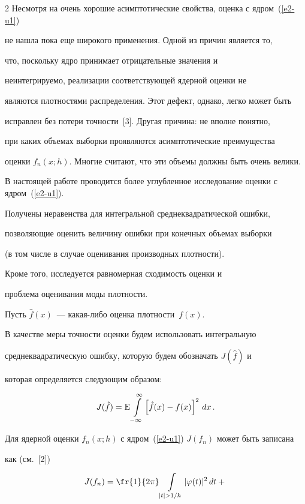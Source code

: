 \begin{multicols}{2}
Несмотря на очень хорошие асимптотические свойства, оценка с ядром~(\ref{e2-u1})

не нашла пока еще широкого применения. Одной из причин является то,

что, поскольку ядро принимает отрицательные значения и

неинтегрируемо, реализации соответствующей ядерной оценки не

являются плотностями распределения. Этот дефект, однако, легко может быть

исправлен без потери точности~[3]. Другая причина: не вполне понятно,

при каких объемах выборки проявляются асимптотические преимущества

оценки $f_n(x;h)$. Многие считают, что эти объемы должны быть очень велики.

В настоящей работе проводится более углубленное исследование оценки с ядром~(\ref{e2-u1}).

Получены неравенства для интегральной среднеквадратической ошибки,

позволяющие оценить величину ошибки при конечных объемах выборки

(в том числе в случае оценивания производных плотности).

Кроме того, исследуется равномерная сходимость оценки и

проблема оценивания моды плотности.



Пусть $\hat f(x)$~--- какая-либо оценка плотности~$f(x)$.

В качестве меры точности оценки будем использовать интегральную

среднеквадратическую ошибку, которую будем обозначать $J(\hat f)$ и

которая определяется следующим образом:

$$

J(\hat f)={\rm E}\int\limits_{-\infty}^\infty\left[\hat f(x)-f(x)\right]^2\,dx\,.

$$

Для ядерной оценки $f_n(x;h)$ с ядром~(\ref{e2-u1}) $J(f_n)$ может быть записана

как (см.~[2])



\noindent

\begin{multline}

J(f_n)=\fr{1}{2\pi}\int\limits_{|t|>1/h}|\varphi(t)|^2\,dt+{}\\


\end{multline}
\end{multicols}
